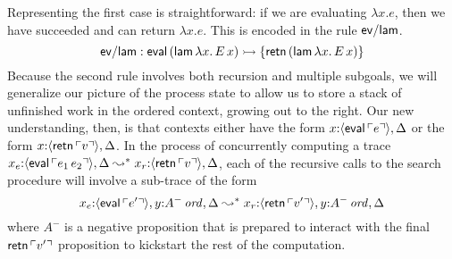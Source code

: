 Representing the first case is straightforward: if we are evaluating
$\lambda x.e$, then we have succeeded and can return $\lambda x.e$. 
This is encoded in the rule ${\sf ev/lam}$. 
\[
{\sf ev/lam} : {\sf eval}\,({\sf lam}\,\lambda x.\,E\,x)
   \rightarrowtail \{ {\sf retn}\,({\sf lam}\,\lambda x.\,E\,x) \}
\]
Because the second rule involves both recursion and multiple subgoals,
we will generalize our picture of the process state to allow us to store a
stack of unfinished work in the ordered context, growing out to the
right. Our new understanding, then, is that contexts either have the
form $x{:}\langle {{\sf eval}\,{\ulcorner{e}\urcorner}} \rangle, \Delta$ or the form $x{:}\langle {{\sf
  retn}\,{\ulcorner{v}\urcorner}} \rangle, \Delta$. In the process of concurrently
computing a trace $x_e{:}\langle {{\sf eval}\,{\ulcorner{e_1\,e_2}\urcorner}} \rangle, \Delta
\leadsto^* x_r{:}\langle {{\sf retn}\,{\ulcorner{v}\urcorner}} \rangle, \Delta$, each of the
recursive calls to the search procedure will involve a sub-trace of the
form
%
\[x_e{:}\langle {{\sf eval}\,{\ulcorner{e'}\urcorner}} \rangle, y{:}{A^-}\,{{\it ord}}, \Delta
  \leadsto^*
  x_r{:}\langle {{\sf retn}\,{\ulcorner{v'}\urcorner}} \rangle, y{:}{A^-}\,{{\it ord}}, \Delta\]
%
where $A^-$ is a negative proposition that is prepared to interact
with the final ${\sf retn}\,{\ulcorner{v'}\urcorner}$ proposition to kickstart the
rest of the computation.

